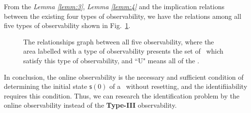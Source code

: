 


From the {\em Lemma \ref{lemm:3}}, {\em Lemma \ref{lemm:4}} and the implication relations between the existing four types of observability, we have the relations among all five types of observability shown in Fig.~\ref{fig:7}.

\begin{figure}[thpb]
      \centering
     \caption{The relationships graph between all five observability, where the area labelled with a type of observability presents the set of \BCNs\ which satisfy this type of observability, and  ``U" means all of the \BCNs.}
      \label{fig:7}
   \end{figure}

In conclusion, the online observability is the necessary and sufficient condition of determining the initial state $\mathsf{s}(0)$ of a \BCN\  without  resetting, %
and the identifiiability requires this condition. Thus, we can research the identification problem by the online observability instead of the {\bf Type-III} observability. 





